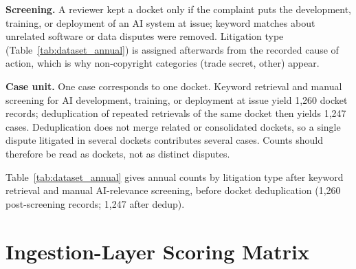 \textbf{Screening.} A reviewer kept a docket only if the complaint puts the development, training, or deployment of an AI system at issue; keyword matches about unrelated software or data disputes were removed. Litigation type (Table~\ref{tab:dataset_annual}) is assigned afterwards from the recorded cause of action, which is why non-copyright categories (trade secret, other) appear.

\textbf{Case unit.} One case corresponds to one docket. Keyword retrieval and manual screening for AI development, training, or deployment at issue yield 1{,}260 docket records; deduplication of repeated retrievals of the same docket then yields 1{,}247 cases. Deduplication does not merge related or consolidated dockets, so a single dispute litigated in several dockets contributes several cases. Counts should therefore be read as dockets, not as distinct disputes.

Table~\ref{tab:dataset_annual} gives annual counts by litigation type after keyword retrieval and manual AI-relevance screening, before docket deduplication (1{,}260 post-screening records; 1{,}247 after dedup).

\begin{table}[h]
\centering
\caption{Annual filing breakdown by litigation type. Counts are post-screening filings (1{,}260) before docket deduplication; the annotated subset contains 1{,}247 cases.}
\label{tab:dataset_annual}
\end{table}

\section{Ingestion-Layer Scoring Matrix}
\label{app:risk_matrix}

